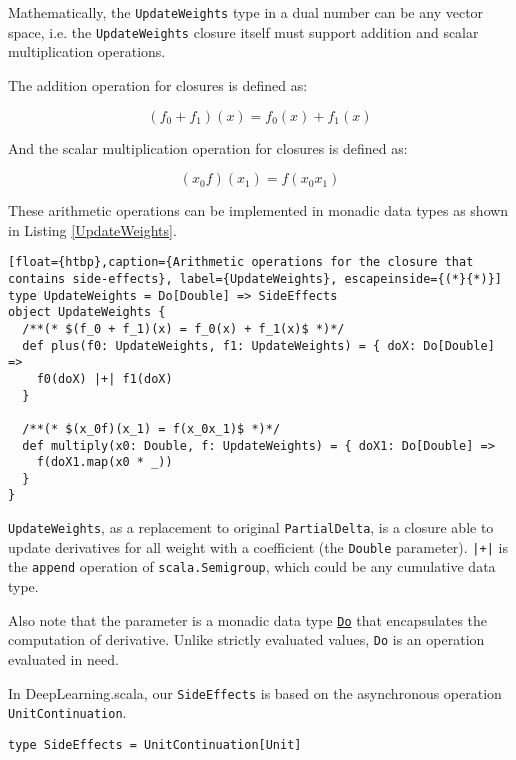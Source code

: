 Mathematically, the \lstinline{UpdateWeights} type in a dual number can be any vector space, i.e. the \lstinline{UpdateWeights} closure itself must support addition and scalar multiplication operations.

The addition operation for closures is defined as:

\begin{equation}
(f_0 + f_1)(x) = f_0(x) + f_1(x)
\end{equation}

And the scalar multiplication operation for closures is defined as:

\begin{equation}
(x_0f)(x_1) = f(x_0x_1)
\end{equation}

These arithmetic operations can be implemented in monadic data types as shown in Listing \ref{UpdateWeights}.

\begin{lstlisting}[float={htbp},caption={Arithmetic operations for the closure that contains side-effects}, label={UpdateWeights}, escapeinside={(*}{*)}]
type UpdateWeights = Do[Double] => SideEffects
object UpdateWeights {
  /**(* $(f_0 + f_1)(x) = f_0(x) + f_1(x)$ *)*/
  def plus(f0: UpdateWeights, f1: UpdateWeights) = { doX: Do[Double] =>
    f0(doX) |+| f1(doX)
  }

  /**(* $(x_0f)(x_1) = f(x_0x_1)$ *)*/
  def multiply(x0: Double, f: UpdateWeights) = { doX1: Do[Double] =>
    f(doX1.map(x0 * _))
  }
}
\end{lstlisting}

\lstinline{UpdateWeights}, as a replacement to original \lstinline{PartialDelta}, is a closure able to update derivatives for all weight with a coefficient (the \lstinline{Double} parameter).
\lstinline{|+|} is the \lstinline{append} operation of \lstinline{scala.Semigroup}, which could be any cumulative data type.

Also note that the parameter is a monadic data type \href{https://javadoc.io/page/com.thoughtworks.raii/asynchronous_2.11/latest/com/thoughtworks/raii/asynchronous$$Do.html}{\lstinline{Do}} that encapsulates the computation of derivative. Unlike strictly evaluated values, \lstinline{Do} is an operation evaluated in need.

In DeepLearning.scala, our \lstinline{SideEffects} is based on the asynchronous operation \lstinline{UnitContinuation}.

\begin{lstlisting}[float={htbp},caption={Monadic side-effects}, label={SideEffects}]
type SideEffects = UnitContinuation[Unit]
\end{lstlisting}

